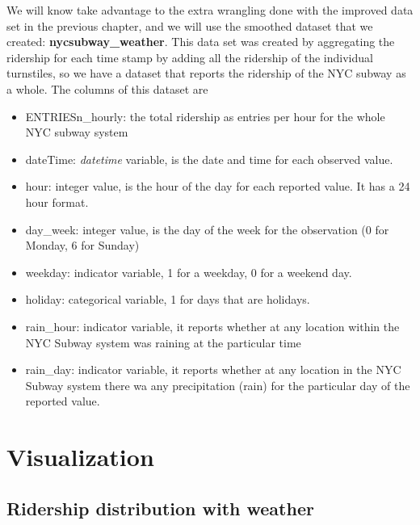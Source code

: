 \documentclass[a4paper,12pt,english]{sphinxmanual}
\begin{document}
We will know take advantage to the extra wrangling done with the improved data set in the
previous chapter, and we will use the smoothed dataset that we created:
\textbf{nycsubway\_weather}. This data set was created by aggregating the ridership for each time
stamp by adding all the ridership of the individual turnstiles, so we have a dataset
that reports the ridership of the NYC subway as a whole. The columns of this dataset are
\begin{itemize}
\item {} 
ENTRIESn\_hourly: the total ridership as entries per hour for the whole NYC subway
system

\item {} 
dateTime: \emph{datetime} variable, is the date and time for each observed value.

\item {} 
hour: integer value, is the hour of the day for each reported value. It has a 24 hour
format.

\item {} 
day\_week: integer value, is the day of the week for the observation (0 for Monday, 6 for
Sunday)

\item {} 
weekday: indicator variable, 1 for a weekday, 0 for a weekend day.

\item {} 
holiday: categorical variable, 1 for days that are holidays.

\item {} 
rain\_hour: indicator variable, it reports whether at any location within the NYC Subway
system was raining at the particular time

\item {} 
rain\_day: indicator variable, it reports whether at any location in the NYC Subway system
there wa any precipitation (rain) for the particular day of the reported value.

\end{itemize}


\chapter{Visualization}
\label{section3:visualization}\label{section3::doc}

\section{Ridership distribution with weather}
\label{section3:ridership-distribution-with-weather}
\end{document}
